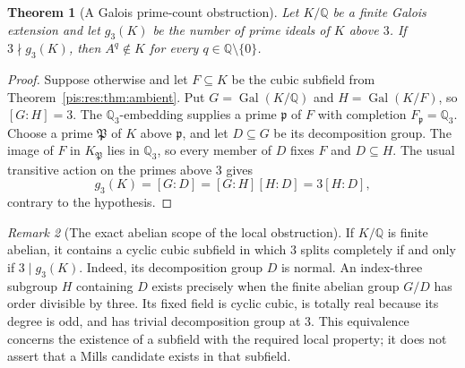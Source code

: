 \documentclass[11pt,a4paper]{article}
\newtheorem{theorem}{Theorem}[section]
\theoremstyle{definition}\newtheorem{definition}[theorem]{Definition}
\theoremstyle{remark}\newtheorem{remark}[theorem]{Remark}
\newcommand{\Q}{\mathbb Q}\newcommand{\R}{\mathbb R}
\begin{document}
\begin{theorem}[A Galois prime-count obstruction]
\label{pis:res:thm:galois}
Let $K/\Q$ be a finite Galois extension and let $g_3(K)$ be the
number of prime ideals of $K$ above $3$. If $3\nmid g_3(K)$, then
$A^q\notin K$ for every $q\in\Q\setminus\{0\}$.
\end{theorem}
\begin{proof}
Suppose otherwise and let $F\subseteq K$ be the cubic subfield from
Theorem~\ref{pis:res:thm:ambient}. Put
$G=\operatorname{Gal}(K/\Q)$ and $H=\operatorname{Gal}(K/F)$, so
$[G:H]=3$. The $\Q_3$-embedding supplies a prime $\mathfrak p$ of
$F$ with completion $F_{\mathfrak p}=\Q_3$. Choose a prime
$\mathfrak P$ of $K$ above $\mathfrak p$, and let $D\subseteq G$ be
its decomposition group. The image of $F$ in $K_{\mathfrak P}$ lies
in $\Q_3$, so every member of $D$ fixes $F$ and $D\subseteq H$.
The usual transitive action on the primes above $3$ gives
\[
 g_3(K)=[G:D]=[G:H][H:D]=3[H:D],
\]
contrary to the hypothesis.
\end{proof}

\begin{remark}[The exact abelian scope of the local obstruction]
\label{pis:res:rem:abelian}
If $K/\Q$ is finite abelian, it contains a cyclic cubic subfield in
which $3$ splits completely if and only if $3\mid g_3(K)$.
Indeed, its decomposition group $D$ is normal. An index-three
subgroup $H$ containing $D$ exists precisely when the finite abelian
group $G/D$ has order divisible by three. Its fixed field is cyclic
cubic, is totally real because its degree is odd, and has trivial
decomposition group at $3$. This equivalence concerns the existence
of a subfield with the required local property; it does not assert
that a Mills candidate exists in that subfield.
\end{remark}
\end{document}
